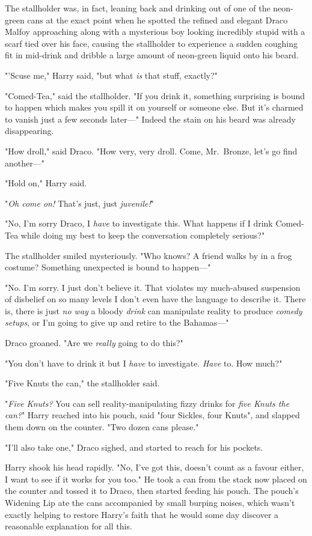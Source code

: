 The stallholder was, in fact, leaning back and drinking out of one of the
neon-green cans at the exact point when he spotted the refined and elegant
Draco Malfoy approaching along with a mysterious boy looking incredibly stupid
with a scarf tied over his face, causing the stallholder to experience a sudden
coughing fit in mid-drink and dribble a large amount of neon-green liquid onto
his beard.

"'Scuse me," Harry said, "but what \emph{is} that stuff, exactly?"

"Comed-Tea," said the stallholder. "If you drink it, something surprising is
bound to happen which makes you spill it on yourself or someone else. But it's
charmed to vanish just a few seconds later---" Indeed the stain on his beard
was already disappearing.

"How droll," said Draco. "How very, very droll. Come, Mr.~Bronze, let's go find
another---"

"Hold on," Harry said.

"\emph{Oh come on!} That's just, just \emph{juvenile!}"

"No, I'm sorry Draco, I \emph{have} to investigate this. What happens if I
drink Comed-Tea while doing my best to keep the conversation completely
serious?"

The stallholder smiled mysteriously. "Who knows? A friend walks by in a frog
costume? Something unexpected is bound to happen---"

"No. I'm sorry. I just don't believe it. That violates my much-abused
suspension of disbelief on so many levels I don't even have the language to
describe it. There is, there is just \emph{no way} a bloody \emph{drink} can
manipulate reality to produce \emph{comedy setups}, or I'm going to give up and
retire to the Bahamas---"

Draco groaned. "Are we \emph{really} going to do this?"

"You don't have to drink it but I \emph{have} to investigate. \emph{Have} to.
How much?"

"Five Knuts the can," the stallholder said.

"\emph{Five Knuts?} You can sell reality-manipulating fizzy drinks for
\emph{five Knuts the can?}" Harry reached into his pouch, said "four Sickles,
four Knuts", and slapped them down on the counter. "Two dozen cans please."

"I'll also take one," Draco sighed, and started to reach for his pockets.

Harry shook his head rapidly. "No, I've got this, doesn't count as a favour
either, I want to see if it works for you too." He took a can from the stack
now placed on the counter and tossed it to Draco, then started feeding his
pouch. The pouch's Widening Lip ate the cans accompanied by small burping
noises, which wasn't exactly helping to restore Harry's faith that he would
some day discover a reasonable explanation for all this.

